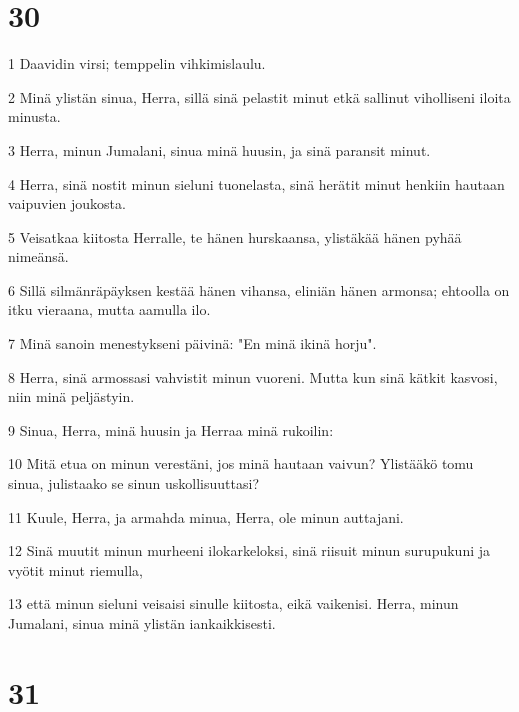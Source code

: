 \chapter{30}

\par 1 Daavidin virsi; temppelin vihkimislaulu.
\par 2 Minä ylistän sinua, Herra, sillä sinä pelastit minut etkä sallinut viholliseni iloita minusta.
\par 3 Herra, minun Jumalani, sinua minä huusin, ja sinä paransit minut.
\par 4 Herra, sinä nostit minun sieluni tuonelasta, sinä herätit minut henkiin hautaan vaipuvien joukosta.
\par 5 Veisatkaa kiitosta Herralle, te hänen hurskaansa, ylistäkää hänen pyhää nimeänsä.
\par 6 Sillä silmänräpäyksen kestää hänen vihansa, eliniän hänen armonsa; ehtoolla on itku vieraana, mutta aamulla ilo.
\par 7 Minä sanoin menestykseni päivinä: "En minä ikinä horju".
\par 8 Herra, sinä armossasi vahvistit minun vuoreni. Mutta kun sinä kätkit kasvosi, niin minä peljästyin.
\par 9 Sinua, Herra, minä huusin ja Herraa minä rukoilin:
\par 10 Mitä etua on minun verestäni, jos minä hautaan vaivun? Ylistääkö tomu sinua, julistaako se sinun uskollisuuttasi?
\par 11 Kuule, Herra, ja armahda minua, Herra, ole minun auttajani.
\par 12 Sinä muutit minun murheeni ilokarkeloksi, sinä riisuit minun surupukuni ja vyötit minut riemulla,
\par 13 että minun sieluni veisaisi sinulle kiitosta, eikä vaikenisi. Herra, minun Jumalani, sinua minä ylistän iankaikkisesti.

\chapter{31}

